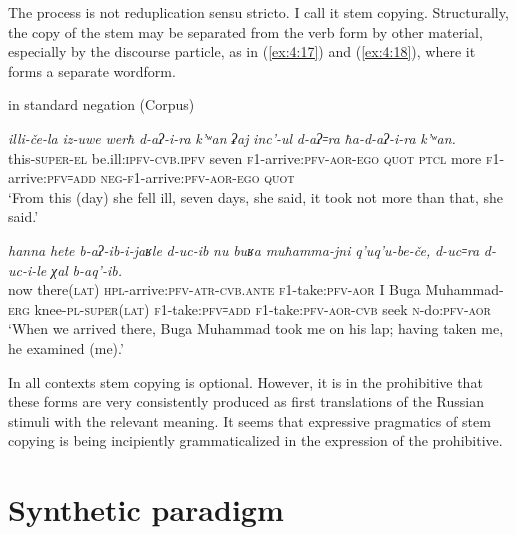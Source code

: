 \documentclass[output=paper]{langsci/langscibook}
\begin{document}
The process is not reduplication sensu stricto. I call it stem copying.
Structurally, the copy of the stem may be separated from the verb form
by other material, especially by the discourse particle, as in (\ref{ex:4:17}) and
(\ref{ex:4:18}), where it forms a separate wordform.

\ea \label{ex:4:17} %
 in standard negation (Corpus)

\gll \emph{illi-če-la}  \emph{iz-uwe}  \emph{werħ}  \emph{d-aʔ-i-ra}  \emph{k'ʷan}  \emph{ʡaj} \emph{inc'-ul}  \emph{d-aʔ꞊ra}  \emph{ħa-d-aʔ-i-ra}  \emph{k'ʷan.}\\
this-\textsc{super}-\textsc{el}  be.ill:\textsc{ipfv}-\textsc{cvb.ipfv}  seven  \textsc{f1}-arrive:\textsc{pfv}-\textsc{aor}-\textsc{ego}  \textsc{quot}  \textsc{ptcl} more \textsc{f1}-arrive:\textsc{pfv}꞊\textsc{add} \textsc{neg}-\textsc{f1}-arrive:\textsc{pfv}-\textsc{aor}-\textsc{ego} \textsc{quot}\\
\glt `From this (day) she fell ill, seven days, she said, it took not more
than that, she said.'

\ex \label{ex:4:18} %
\gll \emph{hanna}  \emph{hete}  \emph{b-aʔ-ib-i-jaʁle}  \emph{d-uc-ib}  \emph{nu}  \emph{buʁa}  \emph{muħamma-jni} \emph{q'uq'u-be-če,}  \emph{d-uc꞊ra}  \emph{d-uc-i-le}  \emph{χal}  \emph{b-aq'-ib.}\\
now  there(\textsc{lat})  \textsc{hpl}-arrive:\textsc{pfv}-\textsc{atr}-\textsc{cvb}.\textsc{ante} \textsc{f1}-take:\textsc{pfv}-\textsc{aor}  I  Buga Muhammad-\textsc{erg} knee-\textsc{pl}-\textsc{super}(\textsc{lat})  \textsc{f1}-take:\textsc{pfv}꞊\textsc{add}  \textsc{f1}-take:\textsc{pfv}-\textsc{aor}-\textsc{cvb}  seek \textsc{n}-do:\textsc{pfv}-\textsc{aor}\\
\glt `When we arrived there, Buga Muhammad took me on his lap; having taken
me, he examined (me).'

\z

In all contexts stem copying is optional. However, it is in the
prohibitive that these forms are very consistently produced as first
translations of the Russian stimuli with the relevant meaning. It seems
that expressive pragmatics of stem copying is being incipiently
grammaticalized in the expression of the prohibitive.


\section{Synthetic paradigm}\label{synthetic-paradigm}
\end{document}
